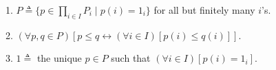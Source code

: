 1. $P \triangleq \{ p \in \prod_{i \in I} P_i \mid p(i) = 1_i \}$ for all but finitely many $i$’s.

2. $(\forall p, q \in P)[p \leq q \leftrightarrow (\forall i \in I)[p(i) \leq q(i)]]$.

3. $1 \triangleq$ the unique $p \in P$ such that $(\forall i \in I)[p(i) = 1_i]$.
